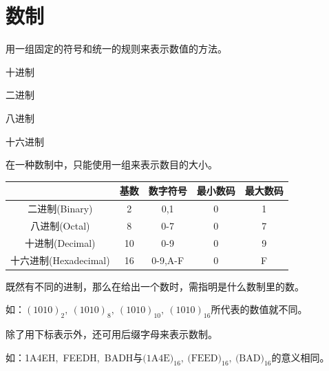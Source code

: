 \section{数制}

\begin{frame}\ft{\secname}
\begin{dingyi}[数制]
用一组固定的符号和统一的规则来表示数值的方法。
\end{dingyi}
\vspace{0.2in}

\begin{AutoMultiColItemize}
\item 十进制
\item 二进制
\item 八进制
\item 十六进制
\end{AutoMultiColItemize}


在一种数制中，只能使用一组来表示数目的大小。

\end{frame}

\begin{frame}\ft{\secname}

\begin{table}
\begin{tabular}{ccccc}\hline
&基数&数字符号&最小数码&最大数码\\\hline
二进制(Binary)&2&0,1&0&1\\[.1in]
八进制(Octal)&8&0-7&0&7\\[.1in]
十进制(Decimal)&10&0-9&0&9\\[.1in]
十六进制(Hexadecimal)&16&0-9,A-F&0&F\\\hline
\end{tabular}
\end{table}

\end{frame}



\begin{frame}\ft{\secname}
{既然有不同的进制，那么在给出一个数时，需指明是什么数制里的数。}
\vspace{0.1in}

如：$(1010)_2,~(1010)_8,~(1010)_{10},~(1010)_{16}$所代表的数值就不同。\vspace{0.15in}

{除了用下标表示外，还可用后缀字母来表示数制。}
\vspace{0.1in}

如：1A4EH,~FEEDH,~BADH与$\mbox{(1A4E)}_{16},~\mbox{(FEED)}_{16},~\mbox{(BAD)}_{16}$的意义相同。
\end{frame}

